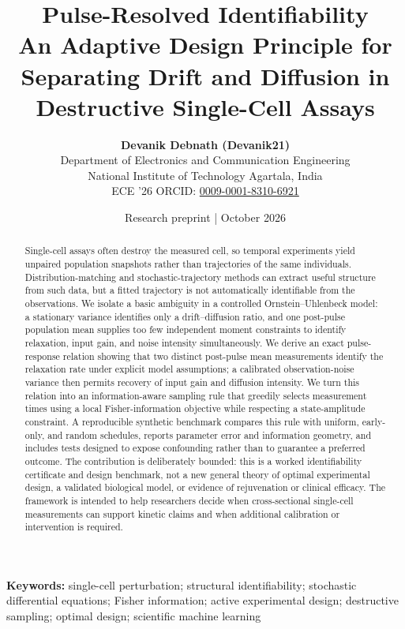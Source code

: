 \documentclass[11pt,a4paper]{article}
\title{\vspace{-1.4em}\textbf{\LARGE Pulse-Resolved Identifiability}\\[0.35em]\large An Adaptive Design Principle for Separating Drift and Diffusion in Destructive Single-Cell Assays}
\author{\textbf{Devanik Debnath (Devanik21)}\\
\small Department of Electronics and Communication Engineering\\
\small National Institute of Technology Agartala, India\\
\small ECE '26 \quad\textbullet\quad ORCID: \href{https://orcid.org/0009-0001-8310-6921}{0009-0001-8310-6921}}
\date{\small Research preprint \quad|\quad 24 October 2026}
\begin{document}
\maketitle
\vspace{-0.8em}
\begin{abstract}
Single-cell assays often destroy the measured cell, so temporal experiments yield unpaired population snapshots rather than trajectories of the same individuals. Distribution-matching and stochastic-trajectory methods can extract useful structure from such data, but a fitted trajectory is not automatically identifiable from the observations. We isolate a basic ambiguity in a controlled Ornstein--Uhlenbeck model: a stationary variance identifies only a drift--diffusion ratio, and one post-pulse population mean supplies too few independent moment constraints to identify relaxation, input gain, and noise intensity simultaneously. We derive an exact pulse-response relation showing that two distinct post-pulse mean measurements identify the relaxation rate under explicit model assumptions; a calibrated observation-noise variance then permits recovery of input gain and diffusion intensity. We turn this relation into an information-aware sampling rule that greedily selects measurement times using a local Fisher-information objective while respecting a state-amplitude constraint. A reproducible synthetic benchmark compares this rule with uniform, early-only, and random schedules, reports parameter error and information geometry, and includes tests designed to expose confounding rather than to guarantee a preferred outcome. The contribution is deliberately bounded: this is a worked identifiability certificate and design benchmark, not a new general theory of optimal experimental design, a validated biological model, or evidence of rejuvenation or clinical efficacy. The framework is intended to help researchers decide when cross-sectional single-cell measurements can support kinetic claims and when additional calibration or intervention is required.
\end{abstract}
\noindent\textbf{Keywords:} single-cell perturbation; structural identifiability; stochastic differential equations; Fisher information; active experimental design; destructive sampling; optimal design; scientific machine learning
\end{document}
